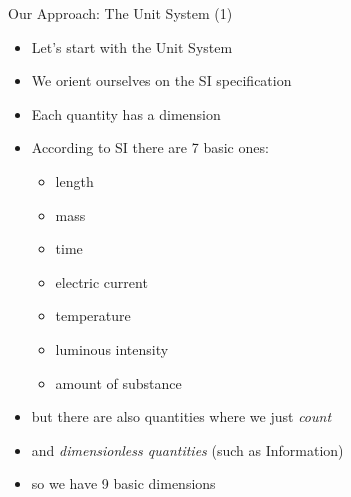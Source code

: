 \documentclass{beamer}
\begin{document}
  \begin{frame}{Our Approach: The Unit System (1)}
    \begin{itemize}[<+->]
      \item Let's start with the Unit System
      \item We orient ourselves on the SI specification
      \item Each quantity has a dimension
      \item According to SI there are 7 basic ones:
      \begin{itemize}
        \item length
        \item mass
        \item time
        \item electric current
        \item temperature
        \item luminous intensity
        \item amount of substance
      \end{itemize}
      \item but there are also quantities where we just \textit{count}
      \item and \textit{dimensionless quantities} (such as Information)
      \item so we have 9 basic dimensions
    \end{itemize}
  \end{frame}
\end{document}
